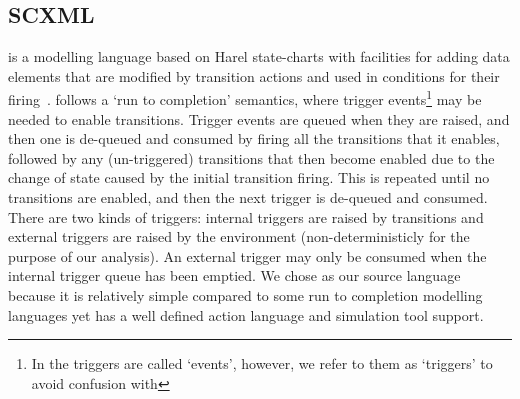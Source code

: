 
\subsection{SCXML}
\label{sec:scxml}

\SCXML is a modelling language based on Harel state-charts with facilities for adding data elements that are modified by transition actions and used in conditions for their firing~\cite{scxmlwebsite}. \SCXML follows a `run to completion' semantics, where trigger events\footnote{In \SCXML the triggers are called `events', however, we refer to them as `triggers' to avoid confusion with \EventB} may be needed to enable transitions. Trigger events are queued when they are raised, and then one is de-queued and consumed by firing all the transitions that it enables, followed by any (un-triggered) transitions that then become enabled due to the change of state caused by the initial transition firing. This is repeated until no transitions are enabled, and then the next trigger is de-queued and consumed. There are two kinds of triggers: internal triggers are raised by transitions and external triggers are raised by the environment (non-deterministicly for the purpose of our analysis). 
An external trigger may only be consumed when the internal trigger queue has been emptied.
We chose \SCXML as our source language because it is relatively simple compared to some run to completion modelling languages yet has a well defined action language and simulation tool support.


